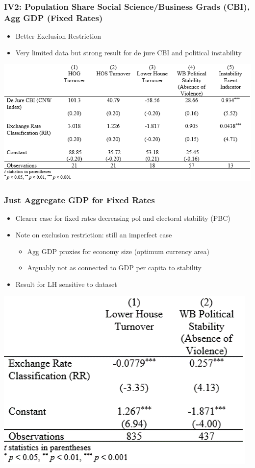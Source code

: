 \documentclass[]{beamer}
\begin{document}
\begin{frame}
\frametitle{IV2: Population Share Social Science/Business Grads (CBI), Agg GDP (Fixed Rates)}
\begin{itemize}
\item Better Exclusion Restriction
\item Very limited data but strong result for de jure CBI and political instability
\end{itemize}
\includegraphics{img0007.png}
\end{frame}


\begin{frame}
\frametitle{Just Aggregate GDP for Fixed Rates}
\begin{itemize}
\item Clearer case for fixed rates decreasing pol and electoral stability (PBC)
\item Note on exclusion restriction: still an imperfect case
\begin{itemize}
\item Agg GDP proxies for economy size (optimum currency area)
\item Arguably not as connected to GDP per capita to stability
\end{itemize}
\item Result for LH sensitive to dataset
\end{itemize}
\includegraphics{img0008.png}
\end{frame}
\end{document}

